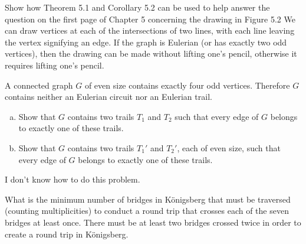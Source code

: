 \documentclass[8pt]{extarticle}
\begin{document}
  \begin{problem}{5}
    Show how Theorem 5.1 and Corollary 5.2 can be used to help answer the question on the first page of Chapter 5 concerning the drawing in Figure 5.2
    \tcblower
    We can draw vertices at each of the intersections of two lines, with each line leaving the vertex signifying an edge. If the graph is Eulerian (or has exactly two odd vertices), then the drawing can be made without lifting one's pencil, otherwise it requires lifting one's pencil.
  \end{problem}
  \begin{problem}{9}
    A connected graph $G$ of even size contains exactly four odd vertices. Therefore $G$ contains neither an Eulerian circuit nor an Eulerian trail.
    \begin{enumerate}[(a)]
      \item Show that $G$ contains two trails $T_1$ and $T_2$ such that every edge of $G$ belongs to exactly one of these trails.
      \item Show that $G$ contains two trails $T_1'$ and $T_2'$, each of even size, such that every edge of $G$ belongs to exactly one of these trails.
    \end{enumerate}
    \tcblower
    I don't know how to do this problem.
  \end{problem}
  \begin{problem}{11}
    What is the minimum number of bridges in Königsberg that must be traversed (counting multiplicities) to conduct a round trip that crosses each of the seven bridges at least once.
    \tcblower
    There must be at least two bridges crossed twice in order to create a round trip in Königsberg.
  \end{problem}
\end{document}
